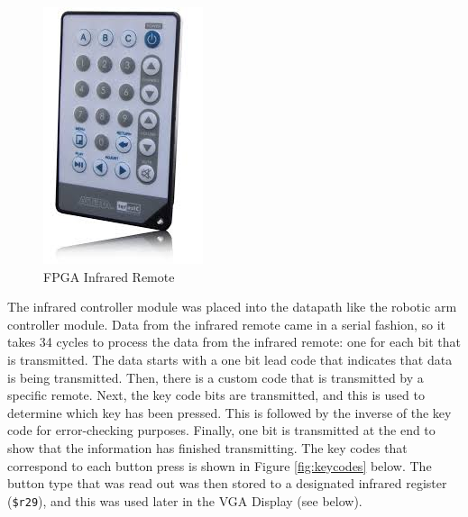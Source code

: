 \documentclass{article}
\begin{document}
        \begin{figure}[H]
            \begin{center}
                \includegraphics[scale=0.7]{remote.jpg}
                \caption{FPGA Infrared Remote}
                \label{fig:remote}
            \end{center}
        \end{figure}
        
        The infrared controller module was placed into the datapath like the robotic arm controller module. Data from the infrared remote came in a serial fashion, so it takes 34 cycles to process the data from the infrared remote: one for each bit that is transmitted. The data starts with a one bit lead code that indicates that data is being transmitted. Then, there is a custom code that is transmitted by a specific remote. Next, the key code bits are transmitted, and this is used to determine which key has been pressed. This is followed by the inverse of the key code for error-checking purposes. Finally, one bit is transmitted at the end to show that the information has finished transmitting. The key codes that correspond to each button press is shown in Figure \ref{fig:keycodes} below. The button type that was read out was then stored to a designated infrared register ({\tt \$r29}), and this was used later in the VGA Display (see below).
        
\end{document}

